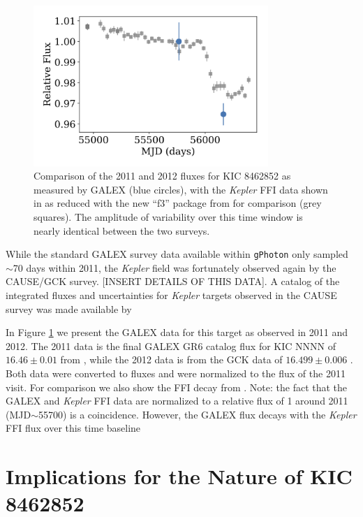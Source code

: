 \documentclass[twocolumn]{aastex6}
\newcommand{\Kepler}{\textsl{Kepler}\xspace}
\begin{document}
\begin{figure}[!ht]
\centering
\includegraphics[width=3.5in]{KIC8462852_compare}
\caption{
Comparison of the 2011 and 2012 fluxes  for KIC 8462852 as measured by GALEX (blue circles), with the \Kepler FFI data shown in \citet{montet2016} as reduced with the new ``f3'' package from \citet{montet2017} for comparison (grey squares). The amplitude of variability over this time window is nearly identical between the two surveys.
}
\label{fig:longtime}
\end{figure}


While the standard GALEX survey data available within {\tt gPhoton} only sampled $\sim$70 days within 2011, the \Kepler field was fortunately observed again by the CAUSE/GCK survey. [INSERT DETAILS OF THIS DATA]. A catalog of the integrated fluxes and uncertainties for \Kepler targets observed in the CAUSE survey was made available by \citet{olmedo2015}


In Figure \ref{fig:longtime} we present the GALEX data for this target as observed in 2011 and 2012. The 2011 data is the final GALEX GR6 catalog flux for KIC NNNN of $16.46 \pm 0.01$ from \citet{bianchi2014}, while the 2012 data is from the GCK data of $16.499\pm0.006$ \citet{olmedo2015}. Both data were converted to fluxes and were normalized to the flux of the 2011 visit. For comparison we also show the FFI decay from \citet{montet2016}. Note: the fact that the GALEX and \Kepler FFI data are normalized to a relative flux of 1 around 2011 (MJD$\sim$55700) is a coincidence. However, the GALEX flux decays with the \Kepler FFI flux over this time baseline






\section{Implications for the Nature of KIC 8462852}
\label{sec:dust}
\end{document}
